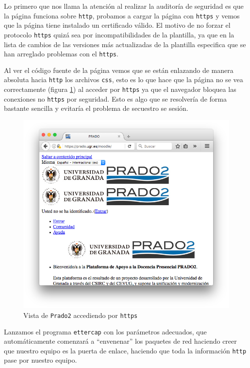 Lo primero que nos llama la atención al realizar la auditoría de seguridad es que la página funciona sobre \texttt{http}, probamos a cargar la página con \texttt{https} y vemos que la página tiene instalado un certificado válido. El motivo de no forzar el protocolo \texttt{https} quizá sea por incompatibilidades de la plantilla, ya que en la lista de cambios de las versiones más actualizadas de la plantilla especifica que se han arreglado problemas con el \texttt{https}\cite{art_11}.

\bigskip
Al ver el código fuente de la página vemos que se están enlazando de manera absoluta hacia \texttt{http} los archivos \texttt{css}, esto es lo que hace que la página no se vea correctamente (figura \ref{fig:pradosincss}) al acceder por \texttt{https} ya que el navegador bloquea las conexiones no \texttt{https} por seguridad. Esto es algo que se resolvería de forma bastante sencilla y evitaría el problema de secuestro se sesión.

\begin{figure}[H]
\centering
\includegraphics[width=1.0\textwidth]{../screenshots/pradosincss}
\caption{Vista de \texttt{Prado2} accediendo por \texttt{https}}
\label{fig:pradosincss}
\end{figure}


\bigskip
Lanzamos el programa \texttt{ettercap} con los parámetros adecuados, que automáticamente comenzará a ``envenenar'' los paquetes de red haciendo creer que nuestro equipo es la puerta de enlace, haciendo que toda la información \texttt{http} pase por nuestro equipo.

